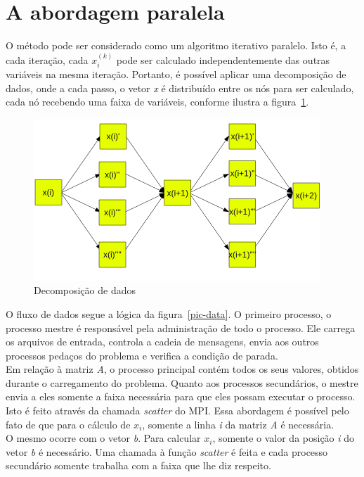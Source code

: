 \documentclass[a4paper]{article}
\begin{document}
\section{A abordagem paralela}
\indent \indent O método pode ser considerado como um algoritmo iterativo paralelo. Isto é, a cada iteração, cada \begin{math}x^{(k)}_i\end{math} pode ser calculado independentemente das outras variáveis na mesma iteração. Portanto, é possível aplicar uma decomposição de dados, onde a cada passo, o vetor \emph{x} é distribuído entre os nós para ser calculado, cada nó recebendo uma faixa de variáveis, conforme ilustra a figura~\ref{pic-dec}.\\
\begin{figure}[float=p]
	\centerline{\includegraphics[width=408px, height=230px]{dec}}
	\caption{Decomposição de dados}
	\label{pic-dec}
\end{figure}
\indent O fluxo de dados segue a lógica da figura~\ref{pic-data}. O primeiro processo, o processo mestre é responsável pela administração de todo o processo. Ele carrega os arquivos de entrada, controla a cadeia de mensagens, envia aos outros processos pedaços do problema e verifica a condição de parada.\\
\indent Em relação à matriz \emph{A}, o processo principal contém todos os seus valores, obtidos durante o carregamento do problema. Quanto aos processos secundários, o mestre envia a eles somente a faixa necessária para que eles possam executar o processo. Isto é feito através da chamada \emph{scatter} do MPI. Essa abordagem é possível pelo fato de que para o cálculo de \begin{math}x_i\end{math}, somente a linha \emph{i} da matriz \emph{A} é necessária.\\
\indent O mesmo ocorre com o vetor \emph{b}. Para calcular \begin{math}x_i\end{math}, somente o valor da posição \emph{i} do vetor \emph{b} é necessário. Uma chamada à função \emph{scatter} é feita e cada processo secundário somente trabalha com a faixa que lhe diz respeito.\\
\end{document}
